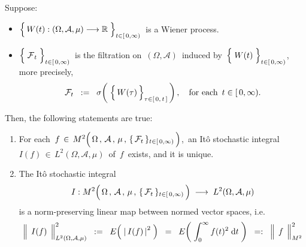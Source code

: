 
\vskip 0.5cm
\begin{theorem}
\mbox{}
\vskip 0.2cm
\noindent
Suppose:
\begin{itemize}
\item
	$\left\{\,\overset{{\color{white}.}}{W}(t) : (\Omega,\mathcal{A},\mu) \longrightarrow \Re \;\right\}_{t \in[\,0,\infty)}$\,
	is a Wiener process.
\item
	$\left\{\;\overset{{\color{white}.}}{\mathcal{F}}_{t}\;\right\}_{t\in[\,0,\infty)}$\,
	is the filtration on \,$(\Omega,\mathcal{A})$\, induced by
	\,$\left\{\;\overset{{\color{white}.}}{W}(t)\;\right\}_{t\in[\,0,\infty)}$,\,
	more precisely,
	\begin{equation*}
	\mathcal{F}_{t}
	\;\; := \;\;
		\sigma\!\left(\;\left\{\,\overset{{\color{white}.}}{W}(\tau)\,\right\}_{\tau\in[\,0,\,t\,]}\,\right),
	\quad
	\textnormal{for each \,$t \in [\,0,\infty)$}.
	\end{equation*}
\end{itemize}
Then, the following statements are true:
\begin{enumerate}
\item
	For each 
	\,$f \,\in\, M^{2}\!
	\left(\,
		\overset{{\color{white}.}}{\Omega} \,,\, \mathcal{A} \,,\, \mu \,,\, \{\,\mathcal{F}_{t}\,\}_{t \in [\,0,\infty)}
		\,\right)$,\,
	an It\^{o} stochastic integral \,$I(f) \,\in\, L^{2}(\Omega,\mathcal{A},\mu)$\, of \,$f$\, exists,
	and it is unique.
\item
	The It\^{o} stochastic integral
	\begin{equation*}
	I : M^{2}\!
		\left(\,
			\overset{{\color{white}.}}{\Omega} \,,\, \mathcal{A} \,,\, \mu \,,\, \{\,\mathcal{F}_{t}\,\}_{t \in [\,0,\infty)}
			\,\right)
	\; \longrightarrow \;
	L^{2}(\Omega,\mathcal{A},\mu)
	\end{equation*}
	is a norm-preserving linear map between normed vector spaces, i.e.
	\begin{equation*}
	\left\Vert\;\, \overset{{\color{white}.}}{I(f)} \,\;\right\Vert_{L^{2}(\Omega,\mathcal{A},\mu)}^{2}
	\;\; := \;\;
		E\!\left(\; \left\vert\, I(f) \,\right\vert^{2} \;\right)
	\;\; = \;\;
		E\!\left(\; \int_{0}^{\infty} f(t)^{2} \;\d t \;\right)
	\;\; =: \;\;
		\left\Vert\;\, \overset{{\color{white}.}}{f} \,\;\right\Vert_{M^{2}}^{2}
	\end{equation*}
\end{enumerate}
\end{theorem}
